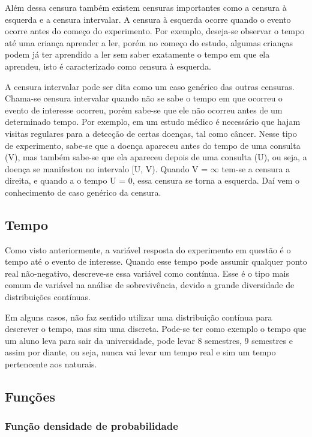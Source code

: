 \documentclass[a4paper,12pt]{article}
\begin{document}
Além dessa censura também existem censuras importantes como a censura à esquerda e a censura intervalar. A censura à esquerda ocorre quando o evento ocorre antes do começo do experimento. Por exemplo, deseja-se observar o tempo até uma criança aprender a ler, porém no começo do estudo, algumas crianças podem já ter aprendido a ler sem saber exatamente o tempo em que ela aprendeu, isto é caracterizado como censura à esquerda. %

A censura intervalar pode ser dita como um caso genérico das outras censuras. Chama-se censura intervalar quando não se sabe o tempo em que ocorreu o evento de interesse
ocorreu, porém sabe-se que ele não ocorreu antes de um determinado tempo. Por exemplo, em um estudo médico é necessário que hajam visitas regulares para a detecção de certas doenças, tal como câncer. Nesse tipo de experimento, sabe-se que a doença apareceu antes do tempo de uma consulta (V), mas também sabe-se que ela apareceu depois de uma consulta (U), ou seja, a doença se manifestou no intervalo [U, V). Quando V = $\infty$
tem-se a censura a direita, e quando a o tempo U = 0, essa censura se torna a esquerda. Daí vem o conhecimento de caso genérico da censura.

\subsection{Tempo}

Como visto anteriormente, a variável resposta do experimento em questão é o tempo até o evento de interesse. Quando esse tempo pode assumir qualquer ponto real não-negativo, descreve-se essa variável como contínua. Esse é o tipo mais comum de variável na análise de sobrevivência, devido a grande diversidade de distribuições contínuas. %

Em alguns casos, não faz sentido utilizar uma distribuição contínua para descrever o tempo, mas sim uma discreta. Pode-se ter como exemplo o tempo que um aluno leva para sair da universidade, pode levar 8 semestres, 9 semestres e assim por diante, ou seja, nunca vai levar um tempo real e sim um tempo pertencente aos naturais.%

\subsection{Funções}

\subsubsection{Função densidade de probabilidade}
\end{document}

